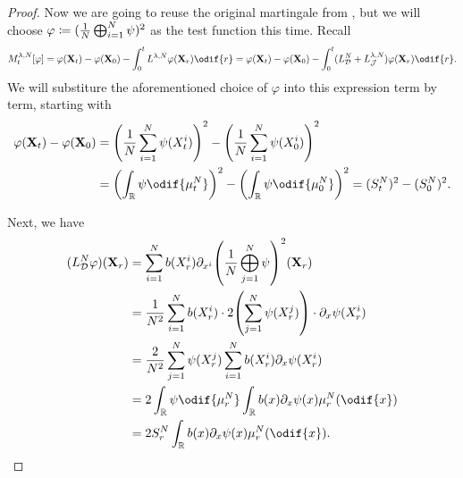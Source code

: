 \begin{proof}
  Now we are going to reuse the original martingale from , but we will choose \(\varphi \coloneqq \lparen \frac{1}{N} \bigoplus_{i=1}^N \psi \rparen^2\) as the test function this time.
  Recall 
  \begin{equation}
    M_t^{\lambda, N}[\varphi]
    = \varphi(\bm{X}_t) - \varphi(\bm{X}_0) - \int_0^t L^{\lambda, N} \varphi (\bm{X}_r) \odif{r}
    = \varphi(\bm{X}_t) - \varphi(\bm{X}_0) - \int_0^t (L_{\cD}^{N} + L_{\cJ}^{\lambda, N}) \varphi (\bm{X}_r) \odif{r}.
  \end{equation}
  We will substiture the aforementioned choice of \( \varphi \) into this expression term by term, starting with
  \begin{equation}
    \begin{split}
      \varphi(\bm{X}_t) - \varphi(\bm{X}_0)
       & = \br*{\frac{1}{N} \sum_{i=1}^N \psi(X_t^i)}^2 - \br*{\frac{1}{N} \sum_{i=1}^N \psi(X_0^i)}^2 \\
       & = \br*{ \int_\potspace \psi \odif{\mu_t^N} }^2 - \br*{ \int_\potspace \psi \odif{\mu_0^N} }^2
      = (S_t^N)^2 - (S_0^N)^2.
    \end{split}
  \end{equation}

  Next, we have
  \begin{equation}
    \begin{split}
      (L_{\cD}^{N} \varphi) (\bm{X}_r)
       & = \sum_{i=1}^N b(X_r^i) \partial_{x^i}\br*{ \frac{1}{N} \bigoplus_{j=1}^N \psi }^2 (\bm{X}_r)               \\
       & = \frac{1}{N^2} \sum_{i=1}^N b(X_r^i) \cdot 2 \br*{ \sum_{j=1}^N \psi(X_r^j) } \cdot \partial_x \psi(X_r^i) \\
       & = \frac{2}{N^2} \sum_{j=1}^N \psi(X_r^j) \sum_{i=1}^N b(X_r^i) \partial_x \psi(X_r^i)                       \\
       & = 2 \int_\potspace \psi \odif{\mu_r^N} \int_\potspace b(x) \partial_x \psi (x) \mu_r^N(\odif{x})            \\
       & = 2 S_r^N \int_\potspace b(x) \partial_x \psi (x) \mu_r^N(\odif{x}).
    \end{split}
  \end{equation}


\end{proof}
